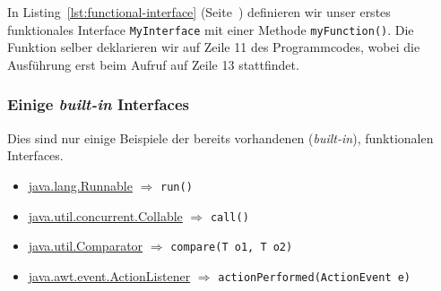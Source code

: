 
\mode*
{}

In Listing~\ref{lst:functional-interface} (Seite~\pageref{lst:functional-interface}) definieren
wir unser erstes funktionales Interface \texttt{MyInterface} mit einer Methode
\texttt{myFunction()}. Die Funktion selber deklarieren wir auf Zeile 11 des Programmcodes,
wobei die Ausführung erst beim Aufruf auf Zeile 13 stattfindet.





\begin{frame}[fragile]
    \frametitle<presentation>{Einige \emph{built-in} Interfaces}
    Dies sind nur einige Beispiele der bereits vorhandenen (\emph{built-in}),
    funktionalen Interfaces.

    \begin{itemize}
        \item \href{https://docs.oracle.com/en/java/javase/11/docs/api/java.base/java/lang/Runnable.html}{java.lang.Runnable} $\Rightarrow$ \texttt{run()}
        \item \href{https://docs.oracle.com/en/java/javase/11/docs/api/java.base/java/util/concurrent/Callable.html#call()}{java.util.concurrent.Collable} $\Rightarrow$ \texttt{call()}
        \item \href{https://docs.oracle.com/en/java/javase/11/docs/api/java.base/java/util/Comparator.html#compare(T,T)}{java.util.Comparator} $\Rightarrow$ \texttt{compare​(T o1, T o2)}
        \item \href{https://docs.oracle.com/en/java/javase/11/docs/api/java.desktop/java/awt/event/ActionListener.html#actionPerformed(java.awt.event.ActionEvent)}{java.awt.event.ActionListener} $\Rightarrow$ \texttt{actionPerformed(ActionEvent e)}
    \end{itemize}

\end{frame}


